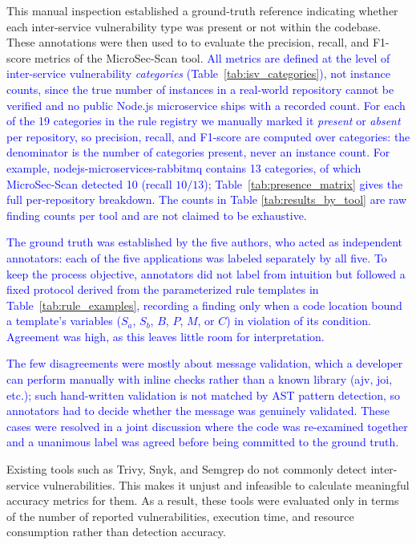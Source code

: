 \documentclass[preprint,12pt]{elsarticle}
\newcommand{\new}[1]{\textcolor{blue}{#1}}
\begin{document}
This manual inspection established a ground-truth reference indicating whether each inter-service vulnerability type was present or not within the codebase. These annotations were then used to to evaluate the precision, recall, and F1-score metrics of the MicroSec-Scan tool. \new{All metrics are defined at the level of inter-service vulnerability \emph{categories} (Table~\ref{tab:isv_categories}), not instance counts, since the true number of instances in a real-world repository cannot be verified and no public Node.js microservice ships with a recorded count. For each of the 19 categories in the rule registry we manually marked it \emph{present} or \emph{absent} per repository, so precision, recall, and F1-score are computed over categories: the denominator is the number of categories present, never an instance count. For example, nodejs-microservices-rabbitmq contains 13 categories, of which MicroSec-Scan detected 10 (recall $10/13$); Table~\ref{tab:presence_matrix} gives the full per-repository breakdown. The counts in Table \ref{tab:results_by_tool} are raw finding counts per tool and are not claimed to be exhaustive.}

\new{The ground truth was established by the five authors, who acted as independent annotators: each of the five applications was labeled separately by all five. To keep the process objective, annotators did not label from intuition but followed a fixed protocol derived from the parameterized rule templates in Table~\ref{tab:rule_examples}, recording a finding only when a code location bound a template's variables ($S_a$, $S_b$, $B$, $P$, $M$, or $C$) in violation of its condition. Agreement was high, as this leaves little room for interpretation.}

\new{The few disagreements were mostly about message validation, which a developer can perform manually with inline checks rather than a known library (ajv, joi, etc.); such hand-written validation is not matched by AST pattern detection, so annotators had to decide whether the message was genuinely validated. These cases were resolved in a joint discussion where the code was re-examined together and a unanimous label was agreed before being committed to the ground truth.}



Existing tools such as Trivy, Snyk, and Semgrep do not commonly detect inter-service vulnerabilities. This makes it unjust and infeasible to calculate meaningful accuracy metrics for them. As a result, these tools were evaluated only in terms of the number of reported vulnerabilities, execution time, and resource consumption rather than detection accuracy.
\end{document}
